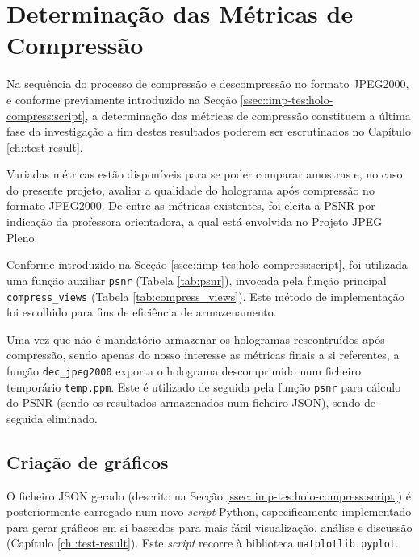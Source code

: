 \section{Determinação das Métricas de Compressão}
\label{sec::imp-test:psnr}


Na sequência do processo de compressão e descompressão no formato JPEG2000, e conforme previamente introduzido na Secção \ref{ssec::imp-tes:holo-compress:script}, a determinação das métricas de compressão constituem a última fase da investigação a fim destes resultados poderem ser escrutinados no Capítulo \ref{ch::test-result}.

Variadas métricas estão disponíveis para se poder comparar amostras e, no caso do presente projeto, avaliar a qualidade do holograma após compressão no formato JPEG2000. De entre as métricas existentes, foi eleita a \acf{PSNR} por indicação da professora orientadora, a qual está envolvida no Projeto JPEG Pleno.

Conforme introduzido na Secção \ref{ssec::imp-tes:holo-compress:script}, foi utilizada uma função auxiliar \verb|psnr| (Tabela \ref{tab:psnr}), invocada pela função principal \verb|compress_views| (Tabela \ref{tab:compress_views}). Este método de implementação foi escolhido para fins de eficiência de armazenamento.

Uma vez que não é mandatório armazenar os hologramas rescontruídos após compressão, sendo apenas do nosso interesse as métricas finais a si referentes, a função \verb|dec_jpeg2000| exporta o holograma descomprimido num ficheiro temporário \verb|temp.ppm|. Este é utilizado de seguida pela função \verb|psnr| para cálculo do \ac{PSNR} (sendo os resultados armazenados num ficheiro \ac{JSON}), sendo de seguida eliminado.


\subsection{Criação de gráficos}
\label{ssec::imp-test:psnr:graf}

O ficheiro \ac{JSON} gerado (descrito na Secção \ref{ssec::imp-tes:holo-compress:script}) é posteriormente carregado num novo \textit{script} Python, especificamente implementado para gerar gráficos em si baseados para mais fácil visualização, análise e discussão (Capítulo \ref{ch::test-result}). Este \textit{script} recorre à biblioteca \verb|matplotlib.pyplot|.

